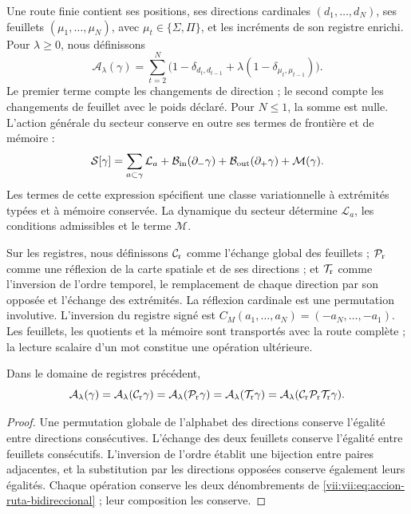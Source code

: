 Une route finie contient ses positions, ses directions cardinales
\((d_1,\ldots,d_N)\), ses feuillets \((\mu_1,\ldots,\mu_N)\), avec
\(\mu_t\in\{\Sigma,\Pi\}\), et les incréments de son registre
enrichi. Pour \(\lambda\geq0\), nous définissons
\begin{equation}
 \mathcal A_\lambda(\gamma)
 =\sum_{t=2}^N
 \bigl(1-\delta_{d_t,d_{t-1}}
       +\lambda(1-\delta_{\mu_t,\mu_{t-1}})\bigr).
 \label{vii:vii:eq:accion-ruta-bidireccional}
\end{equation}
Le premier terme compte les changements de direction ; le second compte les changements
de feuillet avec le poids déclaré. Pour \(N\leq1\), la somme est nulle.
L'action générale du secteur conserve en outre ses termes de frontière et de
mémoire :
\begin{equation}
 \mathcal S[\gamma]
 =\sum_{a\subset\gamma}\mathcal L_a
  +\mathcal B_{\rm in}(\partial_-\gamma)
  +\mathcal B_{\rm out}(\partial_+\gamma)
  +\mathcal M(\gamma).
 \label{vii:vii:eq:accion-enriquecida-frontera}
\end{equation}
Les termes de cette expression spécifient une classe variationnelle à
extrémités typées et à mémoire conservée. La dynamique du secteur détermine
\(\mathcal L_a\), les conditions admissibles et le terme \(\mathcal M\).

Sur les registres, nous définissons \(\mathcal C_{\rm r}\) comme l'échange global des feuillets ; \(\mathcal P_{\rm r}\) comme une réflexion de la carte spatiale et de ses directions ; et \(\mathcal T_{\rm r}\) comme l'inversion de l'ordre temporel, le remplacement de chaque direction par son opposée et l'échange des extrémités. La réflexion cardinale est une permutation involutive. L'inversion du registre signé est \(C_M(a_1,\ldots,a_N)=(-a_N,\ldots,-a_1)\). Les feuillets, les quotients et la mémoire sont transportés avec la route complète ; la lecture scalaire d'un mot constitue une opération ultérieure.

\begin{proposition}
\label{vii:vii:prop:invariancia-ruta-bidireccional}
Dans le domaine de registres précédent,
\[
 \mathcal A_\lambda(\gamma)
 =\mathcal A_\lambda(\mathcal C_{\rm r}\gamma)
 =\mathcal A_\lambda(\mathcal P_{\rm r}\gamma)
 =\mathcal A_\lambda(\mathcal T_{\rm r}\gamma)
 =\mathcal A_\lambda(\mathcal C_{\rm r}\mathcal P_{\rm r}
                              \mathcal T_{\rm r}\gamma).
\]
\end{proposition}
\begin{proof}
Une permutation globale de l'alphabet des directions conserve l'égalité
entre directions consécutives. L'échange des deux feuillets conserve
l'égalité entre feuillets consécutifs. L'inversion de l'ordre établit une
bijection entre paires adjacentes, et la substitution par les directions opposées
conserve également leurs égalités. Chaque opération conserve les deux dénombrements
de \eqref{vii:vii:eq:accion-ruta-bidireccional} ; leur composition les conserve.
\end{proof}

